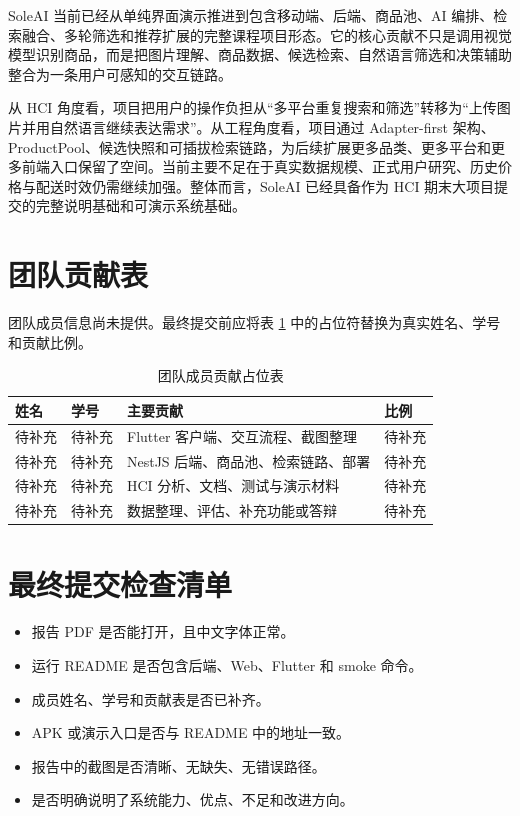 \documentclass[UTF8,a4paper,zihao=-4]{ctexart}
\begin{document}
SoleAI 当前已经从单纯界面演示推进到包含移动端、后端、商品池、AI 编排、检索融合、多轮筛选和推荐扩展的完整课程项目形态。它的核心贡献不只是调用视觉模型识别商品，而是把图片理解、商品数据、候选检索、自然语言筛选和决策辅助整合为一条用户可感知的交互链路。

从 HCI 角度看，项目把用户的操作负担从“多平台重复搜索和筛选”转移为“上传图片并用自然语言继续表达需求”。从工程角度看，项目通过 Adapter-first 架构、ProductPool、候选快照和可插拔检索链路，为后续扩展更多品类、更多平台和更多前端入口保留了空间。当前主要不足在于真实数据规模、正式用户研究、历史价格与配送时效仍需继续加强。整体而言，SoleAI 已经具备作为 HCI 期末大项目提交的完整说明基础和可演示系统基础。

\appendix

\section{团队贡献表}

团队成员信息尚未提供。最终提交前应将表 \ref{tab:team} 中的占位符替换为真实姓名、学号和贡献比例。

\begin{table}[H]
\centering
\caption{团队成员贡献占位表}
\label{tab:team}
\begin{tabularx}{\textwidth}{p{3cm}p{3cm}p{5cm}p{2.2cm}}
\toprule
姓名 & 学号 & 主要贡献 & 比例 \\
\midrule
待补充 & 待补充 & Flutter 客户端、交互流程、截图整理 & 待补充 \\
待补充 & 待补充 & NestJS 后端、商品池、检索链路、部署 & 待补充 \\
待补充 & 待补充 & HCI 分析、文档、测试与演示材料 & 待补充 \\
待补充 & 待补充 & 数据整理、评估、补充功能或答辩 & 待补充 \\
\bottomrule
\end{tabularx}
\end{table}

\section{最终提交检查清单}

\begin{itemize}
  \item 报告 PDF 是否能打开，且中文字体正常。
  \item 运行 README 是否包含后端、Web、Flutter 和 smoke 命令。
  \item 成员姓名、学号和贡献表是否已补齐。
  \item APK 或演示入口是否与 README 中的地址一致。
  \item 报告中的截图是否清晰、无缺失、无错误路径。
  \item 是否明确说明了系统能力、优点、不足和改进方向。
\end{itemize}
\end{document}
